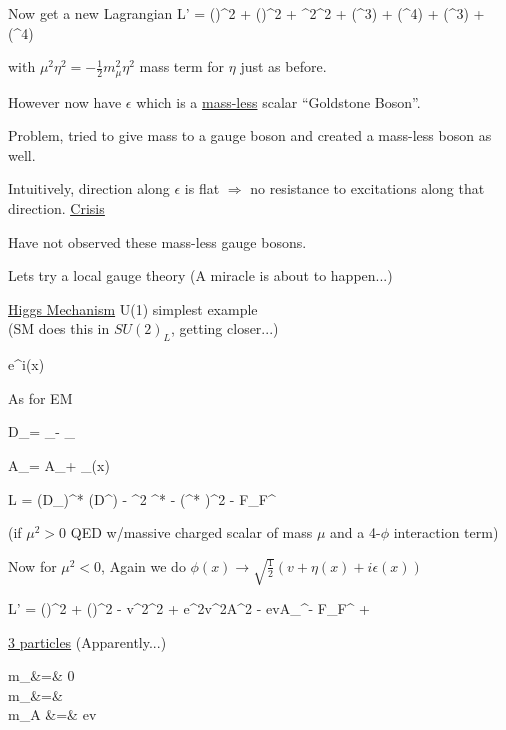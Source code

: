 {Now get a new Lagrangian
\be
L' = (\partial \epsilon)^2 + (\partial \eta)^2 + \mu^2\eta^2 + (\eta^3) + (\eta^4) + (\epsilon^3) + (\epsilon^4) 
\ee

with $\mu^2\eta^2 = -\frac{1}{2}m_\mu^2 \eta^2$ mass term for $\eta$ just as before.


However now have $\epsilon$ which is a \underline{mass-less} scalar ``Goldstone Boson''.

Problem, tried to give mass to a gauge boson and created a mass-less boson as well.

Intuitively, direction along $\epsilon$ is flat $\Rightarrow$ no resistance to excitations along that direction.   \underline{\underline{Crisis}}

Have not observed these mass-less gauge bosons. 

Lets try a local gauge theory (A miracle is about to happen...)

\clearpage

\lineacross

\underline{Higgs Mechanism} U(1) simplest example\\
(SM does this in $SU(2)_L$, getting closer...)

\be
\phi \rightarrow e^{i\alpha(x)} \phi  \hspace*{1in} 
\ee

As for EM

\be
D_\mu = \partial_\mu - _{}
\ee

\be
A_\mu = A_\mu + \partial_\mu \alpha(x)
\ee


\be
L = (D_\mu \phi)^*  (D^\mu \phi) - \mu^2 \phi^* \phi - \lambda(\phi^* \phi)^2 - F_{\mu\nu}F^{\mu\nu}
\ee


(if $\mu^2 > 0$ QED w/massive charged scalar of mass $\mu$ and a 4-$\phi$ interaction term)

Now for $\mu^2 <0$, Again we do $\phi(x) \rightarrow \sqrt{\frac{1}{2}}\left(v + \eta(x) + i\epsilon(x)\right)$

\be
L' = (\partial \epsilon)^2 + (\partial \eta)^2 - v^2\lambda\eta^2 + e^2v^2A^2 - evA_\mu\partial^\mu\epsilon - F_{\mu\nu}F^{\mu\nu} + 
\ee

\underline{3 particles} (Apparently...)

\bea
m_\epsilon &=& 0\ \\
m_\eta &=&  \\
m_A &=& ev\ 
\eea

}
